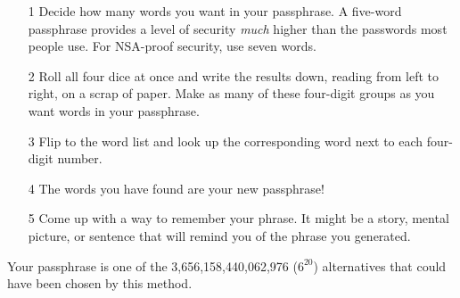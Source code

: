 \begin{itemize}[leftmargin=*]

\setlength\itemsep{.75em}

\item[1] Decide how many words you want in your passphrase. A five-word passphrase provides a level of security \textit{much} higher than the passwords most people use. For NSA-proof security, use seven words.

\item[2] Roll all four dice at once and write the results down, reading from left to right, on a scrap of paper. Make as many of these four-digit groups as you want words in your passphrase.

\item[3] Flip to the word list and look up the corresponding word next to each four-digit number.

\item[4] The words you have found are your new passphrase!

\item[5] Come up with a way to remember your phrase. It might be a story, mental picture, or sentence that will remind you of the phrase you generated.

\end{itemize}

Your passphrase is one of the 3,656,158,440,062,976 ($6^{20}$) alternatives that could have been chosen by this method.

